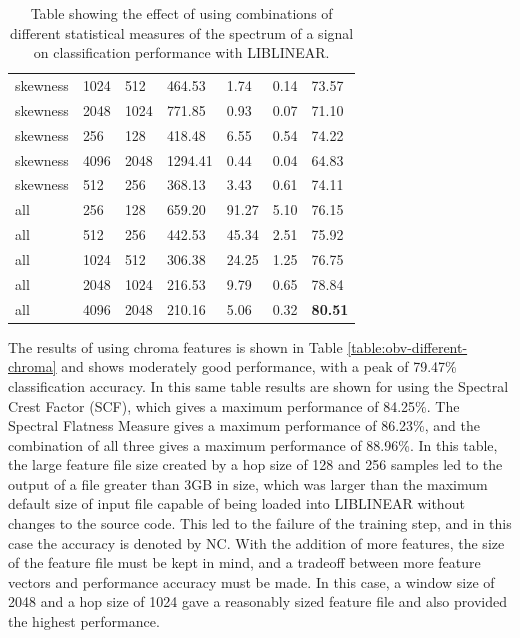 \documentclass[12pt,oneside]{book}
\begin{document}
\begin{table}
\begin{tabular}{|l|l|l|l|l|l|l|}
\hline
skewness & 1024 & 512   &   464.53  &    1.74  &   0.14  &  73.57  \\
skewness & 2048 & 1024  &   771.85  &    0.93  &   0.07  &  71.10  \\
skewness & 256 & 128    &   418.48  &    6.55  &   0.54  &  74.22  \\
skewness & 4096 & 2048  &  1294.41  &    0.44  &   0.04  &  64.83  \\
skewness & 512 & 256    &   368.13  &    3.43  &   0.61  &  74.11  \\
\hline
all & 256 & 128         &   659.20  &   91.27  &   5.10  &  76.15  \\
all & 512 & 256         &   442.53  &   45.34  &   2.51  &  75.92  \\
all & 1024 & 512        &   306.38  &   24.25  &   1.25  &  76.75  \\
all & 2048 & 1024       &   216.53  &    9.79  &   0.65  &  78.84  \\
all & 4096 & 2048       &   210.16  &    5.06  &   0.32  &  \textbf{80.51}  \\
\hline
\end{tabular}
\caption{Table showing the effect of using
  combinations of different statistical measures of the spectrum of a
  signal on classification performance with LIBLINEAR.}
\label{table:obv-different-spectral}
\end{table}

The results of using chroma features is shown in Table
\ref{table:obv-different-chroma} and shows moderately good
performance, with a peak of 79.47\% classification accuracy.  In this
same table results are shown for using the Spectral Crest Factor
(SCF), which gives a maximum performance of 84.25\%.  The Spectral
Flatness Measure gives a maximum performance of 86.23\%, and the
combination of all three gives a maximum performance of 88.96\%.  In
this table, the large feature file size created by a hop size of 128
and 256 samples led to the output of a file greater than 3GB in size,
which was larger than the maximum default size of input file capable
of being loaded into LIBLINEAR without changes to the source code.
This led to the failure of the training step, and in this case the
accuracy is denoted by NC.  With the addition of more features, the
size of the feature file must be kept in mind, and a tradeoff between
more feature vectors and performance accuracy must be made.  In this
case, a window size of 2048 and a hop size of 1024 gave a reasonably
sized feature file and also provided the highest performance.
\end{document}
